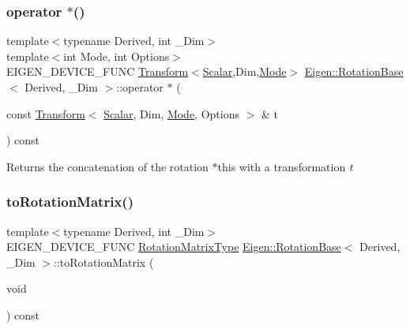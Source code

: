 \subsubsection{\texorpdfstring{operator $\ast$()}{operator *()}\hspace{0.1cm}{\footnotesize\ttfamily [4/4]}}
{\footnotesize\ttfamily template$<$typename Derived, int \+\_\+\+Dim$>$ \\
template$<$int Mode, int Options$>$ \\
E\+I\+G\+E\+N\+\_\+\+D\+E\+V\+I\+C\+E\+\_\+\+F\+U\+NC \mbox{\hyperlink{class_eigen_1_1_transform}{Transform}}$<$\mbox{\hyperlink{class_eigen_1_1_rotation_base_af9b43eac462d7aa70b018efd49c13ef4}{Scalar}},Dim,\mbox{\hyperlink{struct_mode}{Mode}}$>$ \mbox{\hyperlink{class_eigen_1_1_rotation_base}{Eigen\+::\+Rotation\+Base}}$<$ Derived, \+\_\+\+Dim $>$\+::operator $\ast$ (\begin{DoxyParamCaption}\item[{const \mbox{\hyperlink{class_eigen_1_1_transform}{Transform}}$<$ \mbox{\hyperlink{class_eigen_1_1_rotation_base_af9b43eac462d7aa70b018efd49c13ef4}{Scalar}}, Dim, \mbox{\hyperlink{struct_mode}{Mode}}, Options $>$ \&}]{t }\end{DoxyParamCaption}) const\hspace{0.3cm}{\ttfamily [inline]}}

\begin{DoxyReturn}{Returns}
the concatenation of the rotation {\ttfamily $\ast$this} with a transformation {\itshape t} 
\end{DoxyReturn}
\mbox{\label{class_eigen_1_1_rotation_base_aac726e89402a427c605514ce31b01e42}} 
\subsubsection{\texorpdfstring{toRotationMatrix()}{toRotationMatrix()}}
{\footnotesize\ttfamily template$<$typename Derived, int \+\_\+\+Dim$>$ \\
E\+I\+G\+E\+N\+\_\+\+D\+E\+V\+I\+C\+E\+\_\+\+F\+U\+NC \mbox{\hyperlink{class_eigen_1_1_rotation_base_a83602509674c9d635551998460342951}{Rotation\+Matrix\+Type}} \mbox{\hyperlink{class_eigen_1_1_rotation_base}{Eigen\+::\+Rotation\+Base}}$<$ Derived, \+\_\+\+Dim $>$\+::to\+Rotation\+Matrix (\begin{DoxyParamCaption}\item[{void}]{ }\end{DoxyParamCaption}) const\hspace{0.3cm}{\ttfamily [inline]}}


